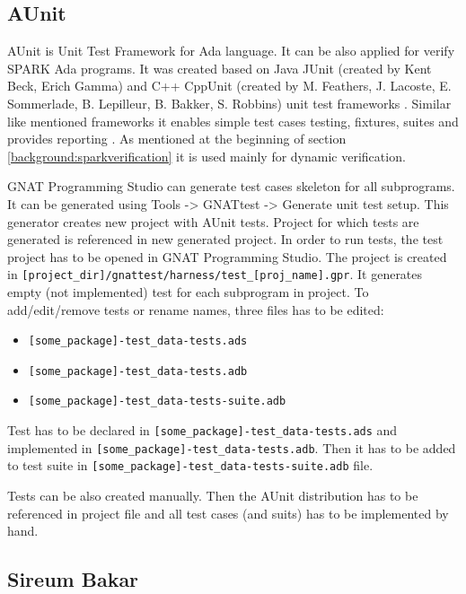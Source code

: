 \subsection{AUnit}
\label{background:sparkverification:aunit}

AUnit is Unit Test Framework for Ada language. It can be also applied for verify SPARK Ada programs. It was created based on Java JUnit (created by Kent Beck, Erich Gamma) and C++ CppUnit (created by M. Feathers, J. Lacoste, E. Sommerlade, B. Lepilleur, B. Bakker, S. Robbins) unit test frameworks \cite{AUnitCookbook:Online}. Similar like mentioned frameworks it enables simple test cases testing, fixtures, suites and provides reporting \cite{AUnitTutorials:Online}. As mentioned at the beginning of section \ref{background:sparkverification} it is used mainly for dynamic verification.

GNAT Programming Studio can generate test cases skeleton for all subprograms. It can be generated using Tools -> GNATtest -> Generate unit test setup. This generator creates new project with AUnit tests. Project for which tests are generated is referenced in new generated project. In order to run tests, the test project has to be opened in GNAT Programming Studio. The project is created in \lstinline{[project_dir]/gnattest/harness/test_[proj_name].gpr}. It generates empty (not implemented) test for each subprogram in project. To add/edit/remove tests or rename names, three files has to be edited:

\begin{itemize}
    \item \lstinline{[some_package]-test_data-tests.ads}
    \item \lstinline{[some_package]-test_data-tests.adb}
    \item \lstinline{[some_package]-test_data-tests-suite.adb}
\end{itemize}

Test has to be declared in \lstinline{[some_package]-test_data-tests.ads} and implemented in \lstinline{[some_package]-test_data-tests.adb}. Then it has to be added to test suite in \lstinline{[some_package]-test_data-tests-suite.adb} file.

Tests can be also created manually. Then the AUnit distribution has to be referenced in project file and all test cases (and suits) has to be implemented by hand.



\subsection{Sireum Bakar}
\label{background:sparkverification:sireum}

